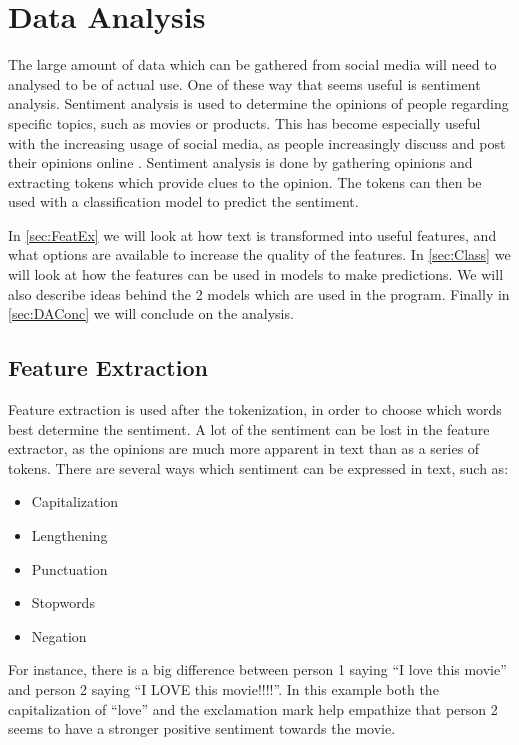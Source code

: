 \chapter{Data Analysis}\label{cha:DA}
The large amount of data which can be gathered from social media will need to
analysed to be of actual use. One of these way that seems useful is sentiment
analysis. Sentiment analysis is used to determine the opinions of people
regarding specific topics, such as movies or products. This has become
especially useful with the increasing usage of social media, as people
increasingly discuss and post their opinions online \citep[Overview
2]{Sentiment}. Sentiment analysis is done by gathering opinions and extracting
tokens which provide clues to the opinion. The tokens can then be used with a
classification model to predict the sentiment.\nl

In \autoref{sec:FeatEx} we will look at how text is transformed into useful
features, and what options are available to increase the quality of the
features. In \autoref{sec:Class} we will look at how the features can be used in
models to make predictions. We will also describe ideas behind the 2 models
which are used in the program. Finally in \autoref{sec:DAConc} we will conclude
on the analysis.

\section{Feature Extraction}\label{sec:FeatEx}
Feature extraction is used after the tokenization, in order to choose which
words best determine the sentiment. A lot of the sentiment can be lost in the
feature extractor, as the opinions are much more apparent in text than as a
series of tokens. There are several ways which sentiment can be expressed in
text, such as\citep[Overview.3-4]{Sentiment}:

\begin{itemize}
  \item Capitalization 
  \item Lengthening
  \item Punctuation
  \item Stopwords
  \item Negation
\end{itemize}

For instance, there is a big difference between person 1 saying ``I love this
movie'' and person 2 saying ``I LOVE this movie!!!!''. In this example both the
capitalization of ``love'' and the exclamation mark help empathize that person
2 seems to have a stronger positive sentiment towards the movie.\nl

